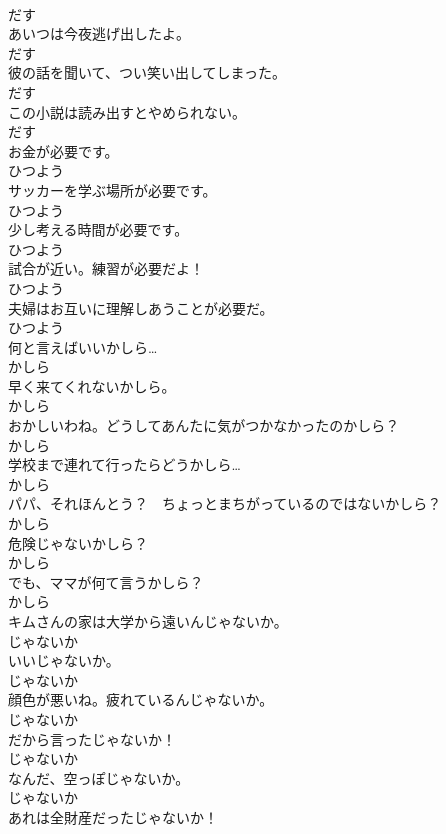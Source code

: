 \documentclass[8pt]{extreport}
\begin{document}
\begin{CJK}{UTF8}{min}
\\	だす
\\	あいつは今夜逃げ出したよ。	
\\	だす
\\	彼の話を聞いて、つい笑い出してしまった。	
\\	だす
\\	この小説は読み出すとやめられない。	
\\	だす
\\	お金が必要です。	
\\	ひつよう
\\	サッカーを学ぶ場所が必要です。	
\\	ひつよう
\\	少し考える時間が必要です。	
\\	ひつよう
\\	試合が近い。練習が必要だよ！	
\\	ひつよう
\\	夫婦はお互いに理解しあうことが必要だ。	
\\	ひつよう
\\	何と言えばいいかしら…	
\\	かしら
\\	早く来てくれないかしら。	
\\	かしら
\\	おかしいわね。どうしてあんたに気がつかなかったのかしら？	
\\	かしら
\\	学校まで連れて行ったらどうかしら…	
\\	かしら
\\	パパ、それほんとう？　ちょっとまちがっているのではないかしら？	
\\	かしら
\\	危険じゃないかしら？	
\\	かしら
\\	でも、ママが何て言うかしら？	
\\	かしら
\\	キムさんの家は大学から遠いんじゃないか。	
\\	じゃないか
\\	いいじゃないか。	
\\	じゃないか
\\	顔色が悪いね。疲れているんじゃないか。	
\\	じゃないか
\\	だから言ったじゃないか！	
\\	じゃないか
\\	なんだ、空っぽじゃないか。	
\\	じゃないか
\\	あれは全財産だったじゃないか！	

\end{CJK}
\end{document}
